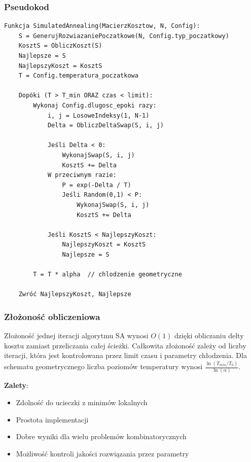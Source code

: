 \documentclass[a4paper,12pt]{article}
\begin{document}
\subsubsection{Pseudokod}

\begin{verbatim}
Funkcja SimulatedAnnealing(MacierzKosztow, N, Config):
    S = GenerujRozwiazaniePoczatkowe(N, Config.typ_poczatkowy)
    KosztS = ObliczKoszt(S)
    Najlepsze = S
    NajlepszyKoszt = KosztS
    T = Config.temperatura_poczatkowa
    
    Dopóki (T > T_min ORAZ czas < limit):
        Wykonaj Config.dlugosc_epoki razy:
            i, j = LosoweIndeksy(1, N-1)
            Delta = ObliczDeltaSwap(S, i, j)
            
            Jeśli Delta < 0:
                WykonajSwap(S, i, j)
                KosztS += Delta
            W przeciwnym razie:
                P = exp(-Delta / T)
                Jeśli Random(0,1) < P:
                    WykonajSwap(S, i, j)
                    KosztS += Delta
                    
            Jeśli KosztS < NajlepszyKoszt:
                NajlepszyKoszt = KosztS
                Najlepsze = S
                
        T = T * alpha  // chlodzenie geometryczne
        
    Zwróć NajlepszyKoszt, Najlepsze
\end{verbatim}

\subsubsection{Złożoność obliczeniowa}

Złożoność jednej iteracji algorytmu SA wynosi $O(1)$ dzięki obliczaniu delty kosztu zamiast przeliczania całej ścieżki.
Całkowita złożoność zależy od liczby iteracji, która jest kontrolowana przez limit czasu i parametry chłodzenia.
Dla schematu geometrycznego liczba poziomów temperatury wynosi $\frac{\ln(T_{min}/T_0)}{\ln(\alpha)}$.

\textbf{Zalety}:
\begin{itemize}
    \item Zdolność do ucieczki z minimów lokalnych
    \item Prostota implementacji
    \item Dobre wyniki dla wielu problemów kombinatorycznych
    \item Możliwość kontroli jakości rozwiązania przez parametry
\end{itemize}
\end{document}
